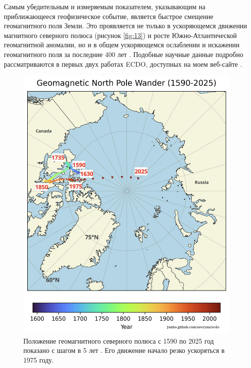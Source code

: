 \documentclass[10pt,twocolumn,letterpaper]{article}
\begin{document}
Самым убедительным и измеряемым показателем, указывающим на приближающееся геофизическое событие, является быстрое смещение геомагнитного поля Земли. Это проявляется не только в ускоряющемся движении магнитного северного полюса (рисунок \ref{fig:13}) и росте Южно-Атлантической геомагнитной аномалии, но и в общем ускоряющемся ослаблении и искажении геомагнитного поля за последние 400 лет \cite{3}. Подобные научные данные подробно рассматриваются в первых двух работах ECDO, доступных на моем веб-сайте \cite{3}.

\begin{figure}[t]
\begin{center}
   \includegraphics[width=1\linewidth]{npw.jpg}
\end{center}
   \caption{Положение геомагнитного северного полюса с 1590 по 2025 год показано с шагом в 5 лет \cite{41}. Его движение начало резко ускоряться в 1975 году.}
\label{fig:13}
\label{fig:onecol}
\end{figure}
\end{document}
